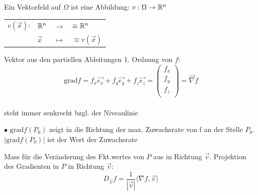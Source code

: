 \documentclass[a4paper]{article}
\begin{document}
		
		\begin{fdef}[Vektorfeld]
			Ein Vektorfeld auf $\Omega$ ist eine Abbildung: $v: \Omega \rightarrow \mathbb{R}^n$\\
			\begin{tabular}{rlll}
				$v(\vec x)$:&$\mathbb{R}^n$		&$\longrightarrow$	&$\equiv \mathbb{R}^n$\\
							&$\vec x$	&$\mapsto$			&$\equiv v(\vec x)$
			\end{tabular}
		\end{fdef}
		\begin{fdef}
			Vektor aus den partiellen Ableitungen 1. Ordnung von $f$: \\[-4mm]
			$$\text{grad} f = f_x \vec{e_x} + f_y \vec{e_y} + f_z \vec{e_z} = 
			\left(
				\begin{array}{c}
							f_x\\
							f_y\\
							f_z\\
				\end{array}
				\right )=\vec{\nabla}f$$\\[-5mm]
			steht immer senkrecht bzgl. der Niveaulinie
		\end{fdef}
				\vspace{-2.2mm}
			$\bullet$ $\text{grad} f (P_0)$ zeigt in die Richtung der max. Zuwachsrate von f an der Stelle $P_0$. $|\text{grad} f (P_0)|$ ist der Wert der Zuwachsrate
		
		
		
% 


		\begin{fdef}[Richtungsableitung]
			Mass für die Veränderung des Fkt.wertes von $P$ aus in Richtung $\vec{v}$. Projektion des Gradienten in $P$ in Richtung $\vec{v}$:
					\vspace{-3mm}
				$$D_{\vec{v}}f = \frac{1}{|\vec{v}|} \langle \nabla f, \vec{v} \rangle$$
					\vspace{-3mm}
		\end{fdef}
	
\end{document}
